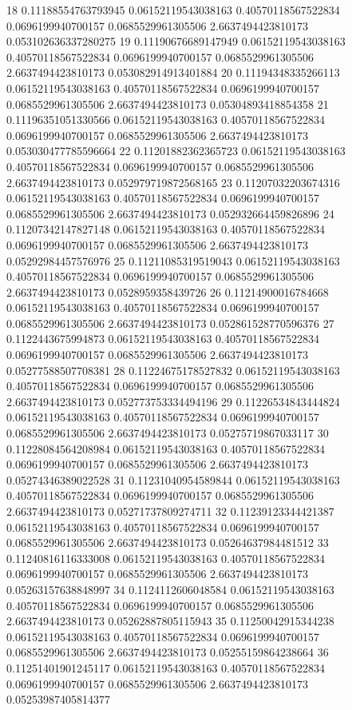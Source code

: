 {18 0.11188554763793945 0.06152119543038163 0.40570118567522834 0.0696199940700157 0.0685529961305506 2.6637494423810173 0.053102636337280275
19 0.11190676689147949 0.06152119543038163 0.40570118567522834 0.0696199940700157 0.0685529961305506 2.6637494423810173 0.053082914913401884
20 0.11194348335266113 0.06152119543038163 0.40570118567522834 0.0696199940700157 0.0685529961305506 2.6637494423810173 0.05304893418854358
21 0.11196351051330566 0.06152119543038163 0.40570118567522834 0.0696199940700157 0.0685529961305506 2.6637494423810173 0.053030477785596664
22 0.11201882362365723 0.06152119543038163 0.40570118567522834 0.0696199940700157 0.0685529961305506 2.6637494423810173 0.052979719872568165
23 0.11207032203674316 0.06152119543038163 0.40570118567522834 0.0696199940700157 0.0685529961305506 2.6637494423810173 0.052932664459826896
24 0.11207342147827148 0.06152119543038163 0.40570118567522834 0.0696199940700157 0.0685529961305506 2.6637494423810173 0.05292984457576976
25 0.11211085319519043 0.06152119543038163 0.40570118567522834 0.0696199940700157 0.0685529961305506 2.6637494423810173 0.0528959358439726
26 0.11214900016784668 0.06152119543038163 0.40570118567522834 0.0696199940700157 0.0685529961305506 2.6637494423810173 0.052861528770596376
27 0.1122443675994873 0.06152119543038163 0.40570118567522834 0.0696199940700157 0.0685529961305506 2.6637494423810173 0.05277588507708381
28 0.11224675178527832 0.06152119543038163 0.40570118567522834 0.0696199940700157 0.0685529961305506 2.6637494423810173 0.052773753334494196
29 0.11226534843444824 0.06152119543038163 0.40570118567522834 0.0696199940700157 0.0685529961305506 2.6637494423810173 0.05275719867033117
30 0.11228084564208984 0.06152119543038163 0.40570118567522834 0.0696199940700157 0.0685529961305506 2.6637494423810173 0.05274346389022528
31 0.11231040954589844 0.06152119543038163 0.40570118567522834 0.0696199940700157 0.0685529961305506 2.6637494423810173 0.05271737809274711
32 0.11239123344421387 0.06152119543038163 0.40570118567522834 0.0696199940700157 0.0685529961305506 2.6637494423810173 0.05264637984481512
33 0.11240816116333008 0.06152119543038163 0.40570118567522834 0.0696199940700157 0.0685529961305506 2.6637494423810173 0.05263157638848997
34 0.1124112606048584 0.06152119543038163 0.40570118567522834 0.0696199940700157 0.0685529961305506 2.6637494423810173 0.05262887805115943
35 0.11250042915344238 0.06152119543038163 0.40570118567522834 0.0696199940700157 0.0685529961305506 2.6637494423810173 0.05255159864238664
36 0.11251401901245117 0.06152119543038163 0.40570118567522834 0.0696199940700157 0.0685529961305506 2.6637494423810173 0.05253987405814377
}
